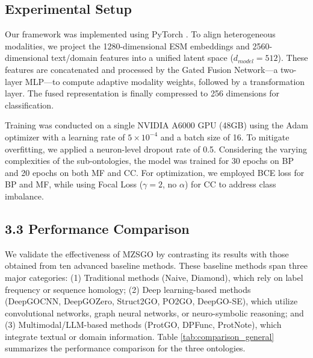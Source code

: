 \documentclass[unnumsec,webpdf,contemporary,large]{oup-authoring-template}%
\theoremstyle{thmstyleone}%
\theoremstyle{thmstyletwo}%
\theoremstyle{thmstylethree}%
\begin{document}
\subsection{Experimental Setup}

Our framework was implemented using PyTorch \citep{paszke2019pytorch}. To align heterogeneous modalities, we project the 1280-dimensional ESM embeddings and 2560-dimensional text/domain features into a unified latent space ($d_{model} = 512$). These features are concatenated and processed by the Gated Fusion Network—a two-layer MLP—to compute adaptive modality weights, followed by a transformation layer. The fused representation is finally compressed to 256 dimensions for classification.

Training was conducted on a single NVIDIA A6000 GPU (48GB) using the Adam optimizer \citep{kingma2014adam} with a learning rate of $5 \times 10^{-4}$ and a batch size of 16. To mitigate overfitting, we applied a neuron-level dropout rate of 0.5. Considering the varying complexities of the sub-ontologies, the model was trained for 30 epochs on BP and 20 epochs on both MF and CC. For optimization, we employed BCE loss for BP and MF, while using Focal Loss ($\gamma=2$, no $\alpha$) for CC to address class imbalance.

\subsection{3.3 Performance Comparison}
We validate the effectiveness of MZSGO by contrasting its results with those obtained from ten advanced baseline methods. These baseline methods span three major categories: (1) Traditional methods (Naive, Diamond), which rely on label frequency or sequence homology; (2) Deep learning-based methods (DeepGOCNN, DeepGOZero, Struct2GO, PO2GO, DeepGO-SE), which utilize convolutional networks, graph neural networks, or neuro-symbolic reasoning; and (3) Multimodal/LLM-based methods (ProtGO, DPFunc, ProtNote), which integrate textual or domain information. Table \ref{tab:comparison_general} summarizes the performance comparison for the three ontologies. 
\end{document}
